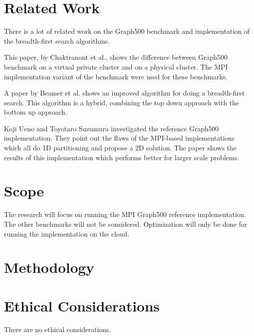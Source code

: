 \documentclass[A4]{scrartcl}
\begin{document}
\section{Related Work}
There is a lot of related work on the Graph500 benchmark and implementation of the breadth-first search algorithms. 

This paper, by Chaktranont et al.\cite{chakthranont2014exploring}, shows the difference between Graph500 benchmark on a virtual private cluster and on a physical cluster. The MPI implementation variant of the benchmark were used for these benchmarks.

A paper by Beamer et al.\cite{beamer2011searching} shows an improved algorithm for doing a breadth-first search. This algorithm is a hybrid, combining the top down approach with the bottom up approach.

Koji Ueno and Toyotaro Suzumura\cite{ueno2012highly} investigated the reference Graph500 implementation. They point out the flaws of the MPI-based implementations which all do 1D partitioning and propose a 2D solution. The paper shows the results of this implementation which performs better for larger scale problems.

\section{Scope}
The research will focus on running the MPI Graph500 reference implementation. The other benchmarks will not be considered. Optimization will only be done for running the implementation on the cloud.


\section{Methodology}



\section{Ethical Considerations}
There are no ethical considerations.

\printbibliography
\end{document}
